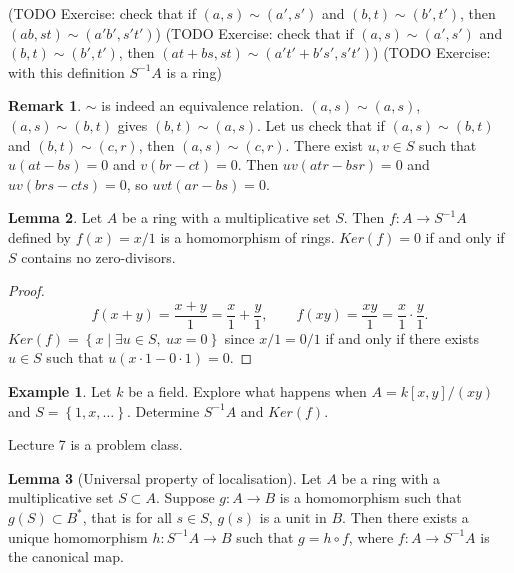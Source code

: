 \documentclass{article}
\newcommand{\rb}[1]{\left( #1 \right)}
\renewcommand{\sb}[1]{\left[ #1 \right]}
\newcommand{\cb}[1]{\left\{ #1 \right\}}
\theoremstyle{definition}\newtheorem{definition}{Definition}[section]
\theoremstyle{definition}\newtheorem{remark}[definition]{Remark}
\theoremstyle{definition}\newtheorem*{example}{Example}
\theoremstyle{definition}\newtheorem*{note}{Note}
\newtheorem{lemma}[definition]{Lemma}
\begin{document}
(TODO Exercise: check that if $ \rb{a, s} \sim \rb{a', s'} $ and $ \rb{b, t} \sim \rb{b', t'} $, then $ \rb{ab, st} \sim \rb{a'b', s't'} $)
(TODO Exercise: check that if $ \rb{a, s} \sim \rb{a', s'} $ and $ \rb{b, t} \sim \rb{b', t'} $, then $ \rb{at + bs, st} \sim \rb{a't' + b's', s't'} $)
(TODO Exercise: with this definition $ S^{-1}A $ is a ring)

\begin{remark}
$ \sim $ is indeed an equivalence relation. $ \rb{a, s} \sim \rb{a, s} $, $ \rb{a, s} \sim \rb{b, t} $ gives $ \rb{b, t} \sim \rb{a, s} $. Let us check that if $ \rb{a, s} \sim \rb{b, t} $ and $ \rb{b, t} \sim \rb{c, r} $, then $ \rb{a, s} \sim \rb{c, r} $. There exist $ u, v \in S $ such that $ u\rb{at - bs} = 0 $ and $ v\rb{br - ct} = 0 $. Then $ uv\rb{atr - bsr} = 0 $ and $ uv\rb{brs - cts} = 0 $, so $ uvt\rb{ar - bs} = 0 $.
\end{remark}

\begin{lemma}
Let $ A $ be a ring with a multiplicative set $ S $. Then $ f : A \to S^{-1}A $ defined by $ f\rb{x} = x / 1 $ is a homomorphism of rings. $ Ker\rb{f} = 0 $ if and only if $ S $ contains no zero-divisors.
\end{lemma}

\begin{proof}
$$ f\rb{x + y} = \dfrac{x + y}{1} = \dfrac{x}{1} + \dfrac{y}{1}, \qquad f\rb{xy} = \dfrac{xy}{1} = \dfrac{x}{1} \cdot \dfrac{y}{1}. $$
$ Ker\rb{f} = \cb{x \mid \exists u \in S, \ ux = 0} $ since $ x / 1 = 0 / 1 $ if and only if there exists $ u \in S $ such that $ u\rb{x \cdot 1 - 0 \cdot 1} = 0 $.
\end{proof}

\begin{example}
Let $ k $ be a field. Explore what happens when $ A = k\sb{x, y} / \rb{xy} $ and $ S = \cb{1, x, \dots} $. Determine $ S^{-1}A $ and $ Ker\rb{f} $.
\end{example}


Lecture 7 is a problem class.


\begin{lemma}[Universal property of localisation]
Let $ A $ be a ring with a multiplicative set $ S \subset A $. Suppose $ g : A \to B $ is a homomorphism such that $ g\rb{S} \subset B^* $, that is for all $ s \in S $, $ g\rb{s} $ is a unit in $ B $. Then there exists a unique homomorphism $ h : S^{-1}A \to B $ such that $ g = h \circ f $, where $ f : A \to S^{-1}A $ is the canonical map.
\end{lemma}
\end{document}
